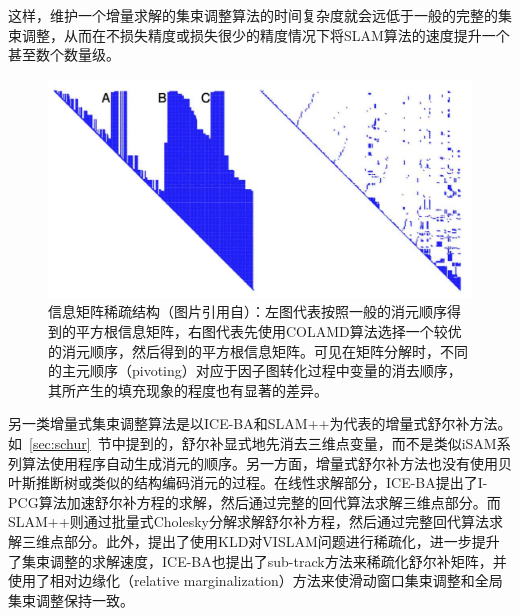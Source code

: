 这样，维护一个增量求解的集束调整算法的时间复杂度就会远低于一般的完整的集束调整，从而在不损失精度或损失很少的精度情况下将SLAM算法的速度提升一个甚至数个数量级。

\begin{figure}[htb!]
    \centering
    \includegraphics[width=.7\textwidth]{Pictures/sparse_pattern.png}
    \caption{信息矩阵稀疏结构（图片引用自\citep{kaess2008isam}）：左图代表按照一般的消元顺序得到的平方根信息矩阵，右图代表先使用COLAMD算法选择一个较优的消元顺序，然后得到的平方根信息矩阵。可见在矩阵分解时，不同的主元顺序（pivoting）对应于因子图转化过程中变量的消去顺序，其所产生的填充现象的程度也有显著的差异。}
    \label{fig:fill_in}
\end{figure}

另一类增量式集束调整算法是以ICE-BA和SLAM++为代表的增量式舒尔补方法。如~\ref{sec:schur}~节中提到的，舒尔补显式地先消去三维点变量，而不是类似iSAM系列算法使用程序自动生成消元的顺序。另一方面，增量式舒尔补方法也没有使用贝叶斯推断树或类似的结构编码消元的过程。在线性求解部分，ICE-BA提出了I-PCG算法加速舒尔补方程的求解，然后通过完整的回代算法求解三维点部分。而SLAM++则通过批量式Cholesky分解求解舒尔补方程，然后通过完整回代算法求解三维点部分。此外，提出了使用KLD对VISLAM问题进行稀疏化，进一步提升了集束调整的求解速度，ICE-BA也提出了sub-track方法来稀疏化舒尔补矩阵，并使用了相对边缘化（relative marginalization）方法来使滑动窗口集束调整和全局集束调整保持一致。
